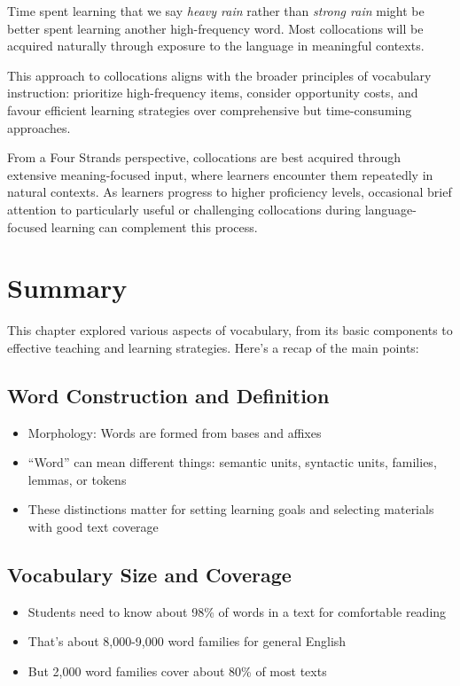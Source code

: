 \ea 
\ea Time spent learning that we say \textit{heavy rain} rather than \textit{strong rain} might be better spent learning another high-frequency word.
\ex Most collocations will be acquired naturally through exposure to the language in meaningful contexts.
\z
\z

This approach to collocations aligns with the broader principles of vocabulary instruction: prioritize high-frequency items, consider opportunity costs, and favour efficient learning strategies over comprehensive but time-consuming approaches.

From a Four Strands perspective, collocations are best acquired through extensive meaning-focused input, where learners encounter them repeatedly in natural contexts. As learners progress to higher proficiency levels, occasional brief attention to particularly useful or challenging collocations during language-focused learning can complement this process.

\section{Summary}

This chapter explored various aspects of vocabulary, from its basic components to effective teaching and learning strategies. Here's a recap of the main points:

\subsection*{Word Construction and Definition}

\begin{itemize}
\item Morphology: Words are formed from bases and affixes
\item ``Word'' can mean different things: semantic units, syntactic units, families, lemmas, or tokens
\item These distinctions matter for setting learning goals and selecting materials with good text coverage
\end{itemize}

\subsection*{Vocabulary Size and Coverage}

\begin{itemize}
\item Students need to know about 98\% of words in a text for comfortable reading
\item That's about 8,000-9,000 word families for general English
\item But 2,000 word families cover about 80\% of most texts
\end{itemize}


